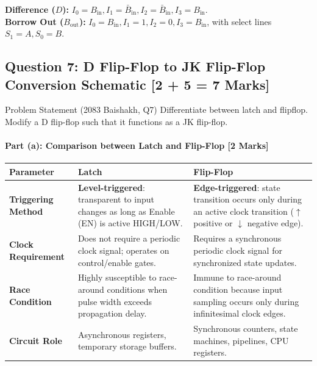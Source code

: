 \documentclass[11pt,a4paper,oneside]{book}
\begin{document}
\begin{answerbox}
\textbf{Difference ($D$):} $I_0 = B_{\text{in}}, I_1 = \bar{B}_{\text{in}}, I_2 = \bar{B}_{\text{in}}, I_3 = B_{\text{in}}$.\\
\textbf{Borrow Out ($B_{\text{out}}$):} $I_0 = B_{\text{in}}, I_1 = 1, I_2 = 0, I_3 = B_{\text{in}}$, with select lines $S_1 = A, S_0 = B$.
\end{answerbox}

\vspace{0.6cm}

\subsection{Question 7: D Flip-Flop to JK Flip-Flop Conversion Schematic [2 + 5 = 7 Marks]}
\begin{questionbox}{Problem Statement (2083 Baishakh, Q7)}
Differentiate between latch and flipflop. Modify a D flip-flop such that it functions as a JK flip-flop.
\end{questionbox}

\paragraph{Part (a): Comparison between Latch and Flip-Flop [2 Marks]}
\begin{center}
\small
\begin{tabular}{@{}p{3.2cm}p{6.8cm}p{6.8cm}@{}}
\toprule
\textbf{Parameter} & \textbf{Latch} & \textbf{Flip-Flop} \\
\midrule
\textbf{Triggering Method} & \textbf{Level-triggered}: transparent to input changes as long as Enable (EN) is active HIGH/LOW. & \textbf{Edge-triggered}: state transition occurs only during an active clock transition ($\uparrow$ positive or $\downarrow$ negative edge). \\
\textbf{Clock Requirement} & Does not require a periodic clock signal; operates on control/enable gates. & Requires a synchronous periodic clock signal for synchronized state updates. \\
\textbf{Race Condition} & Highly susceptible to race-around conditions when pulse width exceeds propagation delay. & Immune to race-around condition because input sampling occurs only during infinitesimal clock edges. \\
\textbf{Circuit Role} & Asynchronous registers, temporary storage buffers. & Synchronous counters, state machines, pipelines, CPU registers. \\
\bottomrule
\end{tabular}
\end{center}
\end{document}
